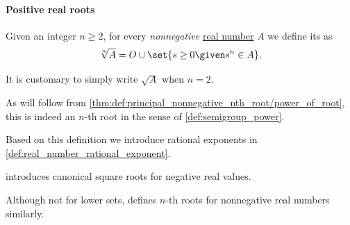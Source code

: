 \paragraph{Positive real roots}

\begin{definition}\label{def:principal_nonnegative_nth_root}\mimprovised
  Given an integer \( n \geq 2 \), for every \emph{nonnegative} \hyperref[def:real_numbers]{real number} \( A \) we define its  as
  \begin{equation}\label{eq:def:principal_nonnegative_nth_root}
    \sqrt[n]{ A } = O \cup \set{ s \geq 0 \given s^n \in A }.
  \end{equation}

  It is customary to simply write \( \sqrt{ A } \) when \( n = 2 \).
\end{definition}
\begin{comments}
  \item As will follow from \cref{thm:def:principal_nonnegative_nth_root/power_of_root}, this is indeed an \( n \)-th root in the sense of \cref{def:semigroup_power}.

  \item Based on this definition we introduce rational exponents in \cref{def:real_number_rational_exponent}.

  \item {} introduces canonical square roots for negative real values.

  \item Although not for lower sets, \textcite[def. 5.6.4]{Tao2022AnalysisI} defines \( n \)-th roots for nonnegative real numbers similarly.
\end{comments}
